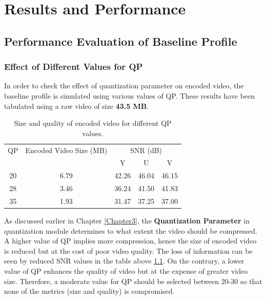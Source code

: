 
\chapter{Results and Performance} %
\label{Chapter5}



\section{Performance Evaluation of Baseline Profile}

\subsection{Effect of Different Values for QP}
In order to check the effect of quantization parameter on encoded video, the baseline profile is simulated using various values of QP. These results have been tabulated using a raw video of size \textbf{43.5 MB}.
\begin{table}[H]
\centering
\begin{tabular}{|c|c|c|c|c|} \hline
QP  & Encoded Video Size (MB) & \multicolumn{3}{|c|}{SNR (dB)}  \\ 
\cline{3-5}
    &                    &  Y & U & V \\ \hline
20  &    6.79            & 42.26   & 46.04  & 46.15  \\ \hline
28  &    3.46            & 36.24   & 41.50  & 41.83  \\ \hline
35  &    1.93            & 31.47   & 37.25  & 37.00  \\ \hline
\end{tabular}
\caption{Size and quality of encoded video for different QP values.}
\label{tab:qp}
\end{table}
As discussed earlier in Chapter \ref{Chapter3}, the \textbf{Quantization Parameter} in quantization module determines to what extent the video should be compressed. A higher value of QP implies more compression, hence the size of encoded video is reduced but at the cost of poor video quality. The loss of information can be seen by reduced SNR values in the table above \ref{tab:qp}. On the contrary, a lower value of QP enhances the quality of video but at the expense of greater video size. Therefore, a moderate value for QP should be selected between 20-30 so that none of the metrics (size and quality) is compromised. 

